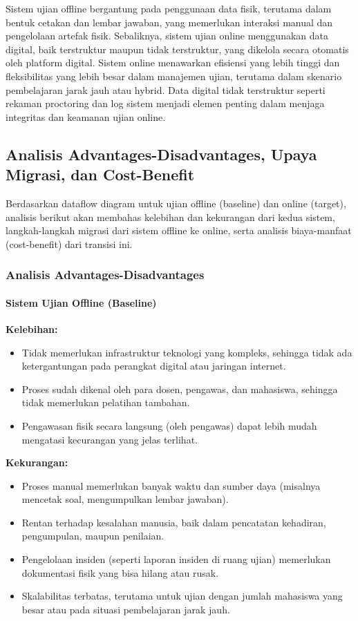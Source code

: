 Sistem ujian offline bergantung pada penggunaan data fisik, terutama dalam bentuk cetakan dan lembar jawaban, yang memerlukan interaksi manual dan pengelolaan artefak fisik. Sebaliknya, sistem ujian online menggunakan data digital, baik terstruktur maupun tidak terstruktur, yang dikelola secara otomatis oleh platform digital. Sistem online menawarkan efisiensi yang lebih tinggi dan fleksibilitas yang lebih besar dalam manajemen ujian, terutama dalam skenario pembelajaran jarak jauh atau hybrid. Data digital tidak terstruktur seperti rekaman proctoring dan log sistem menjadi elemen penting dalam menjaga integritas dan keamanan ujian online.

\subsection{Analisis Advantages-Disadvantages, Upaya Migrasi, dan Cost-Benefit}

Berdasarkan dataflow diagram untuk ujian offline (baseline) dan online (target), analisis berikut akan membahas kelebihan dan kekurangan dari kedua sistem, langkah-langkah migrasi dari sistem offline ke online, serta analisis biaya-manfaat (cost-benefit) dari transisi ini.

\subsubsection{Analisis Advantages-Disadvantages}

\paragraph{Sistem Ujian Offline (Baseline)}
\textbf{Kelebihan:}
\begin{itemize}
	\item Tidak memerlukan infrastruktur teknologi yang kompleks, sehingga tidak ada ketergantungan pada perangkat digital atau jaringan internet.
	\item Proses sudah dikenal oleh para dosen, pengawas, dan mahasiswa, sehingga tidak memerlukan pelatihan tambahan.
	\item Pengawasan fisik secara langsung (oleh pengawas) dapat lebih mudah mengatasi kecurangan yang jelas terlihat.
\end{itemize}

\textbf{Kekurangan:}
\begin{itemize}
	\item Proses manual memerlukan banyak waktu dan sumber daya (misalnya mencetak soal, mengumpulkan lembar jawaban).
	\item Rentan terhadap kesalahan manusia, baik dalam pencatatan kehadiran, pengumpulan, maupun penilaian.
	\item Pengelolaan insiden (seperti laporan insiden di ruang ujian) memerlukan dokumentasi fisik yang bisa hilang atau rusak.
	\item Skalabilitas terbatas, terutama untuk ujian dengan jumlah mahasiswa yang besar atau pada situasi pembelajaran jarak jauh.
\end{itemize}

